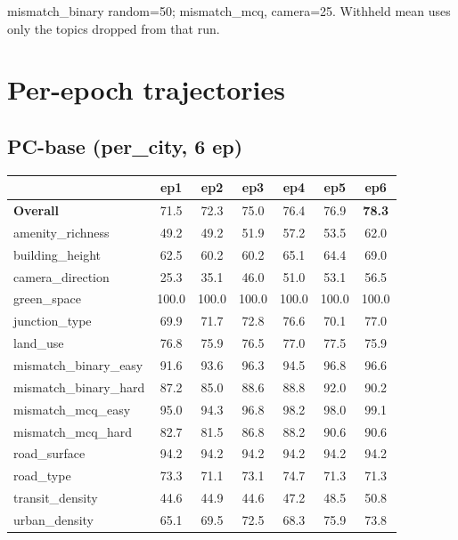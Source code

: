 \documentclass[11pt]{article}
\begin{document}
mismatch\_binary random=50; mismatch\_mcq, camera=25. Withheld mean uses only the topics dropped from that run.

\appendix
\newpage
\section{Per-epoch trajectories}\label{app:per-epoch}

\subsection*{PC-base (per\_city, 6 ep)}

\begin{table}[h]\centering\scriptsize
\setlength{\tabcolsep}{5pt}
\begin{tabular}{l c c c c c c}
\toprule
& ep1 & ep2 & ep3 & ep4 & ep5 & ep6 \\
\midrule
\textbf{Overall}      & 71.5 & 72.3 & 75.0 & 76.4 & 76.9 & \textbf{78.3} \\
amenity\_richness     & 49.2 & 49.2 & 51.9 & 57.2 & 53.5 & 62.0 \\
building\_height      & 62.5 & 60.2 & 60.2 & 65.1 & 64.4 & 69.0 \\
camera\_direction     & 25.3 & 35.1 & 46.0 & 51.0 & 53.1 & 56.5 \\
green\_space          & 100.0 & 100.0 & 100.0 & 100.0 & 100.0 & 100.0 \\
junction\_type        & 69.9 & 71.7 & 72.8 & 76.6 & 70.1 & 77.0 \\
land\_use             & 76.8 & 75.9 & 76.5 & 77.0 & 77.5 & 75.9 \\
mismatch\_binary\_easy& 91.6 & 93.6 & 96.3 & 94.5 & 96.8 & 96.6 \\
mismatch\_binary\_hard& 87.2 & 85.0 & 88.6 & 88.8 & 92.0 & 90.2 \\
mismatch\_mcq\_easy   & 95.0 & 94.3 & 96.8 & 98.2 & 98.0 & 99.1 \\
mismatch\_mcq\_hard   & 82.7 & 81.5 & 86.8 & 88.2 & 90.6 & 90.6 \\
road\_surface         & 94.2 & 94.2 & 94.2 & 94.2 & 94.2 & 94.2 \\
road\_type            & 73.3 & 71.1 & 73.1 & 74.7 & 71.3 & 71.3 \\
transit\_density      & 44.6 & 44.9 & 44.6 & 47.2 & 48.5 & 50.8 \\
urban\_density        & 65.1 & 69.5 & 72.5 & 68.3 & 75.9 & 73.8 \\
\bottomrule
\end{tabular}
\end{table}
\end{document}
